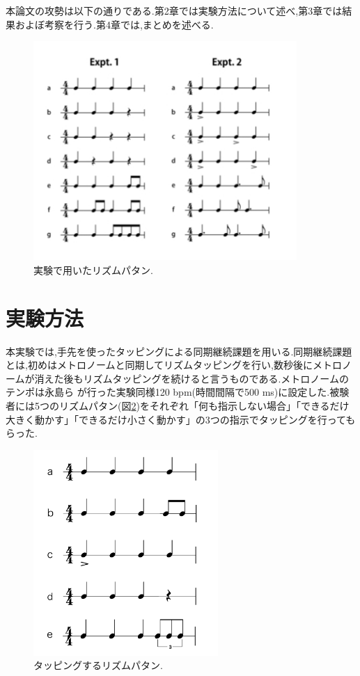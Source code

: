 \documentclass[12pt]{jarticle}
\begin{document}
本論文の攻勢は以下の通りである.第2章では実験方法について述べ,第3章では結果およぼ考察を行う.第4章では,まとめを述べる.
\begin{figure}
  \centering
  \includegraphics[width=10cm]{Nagasima.jpg}
  \caption{実験で用いたリズムパタン\cite{Nagasima}.}
  \label{Nagasima}
\end{figure}

\section{実験方法}
本実験では,手先を使ったタッピングによる同期継続課題を用いる.同期継続課題とは,初めはメトロノームと同期してリズムタッピングを行い,数秒後にメトロノームが消えた後もリズムタッピングを続けると言うものである.メトロノームのテンポは永島ら \cite{Nagasima}が行った実験同様120 bpm(時間間隔で500 ms)に設定した.被験者には5つのリズムパタン(図\ref{pattern})をそれぞれ「何も指示しない場合」「できるだけ大きく動かす」「できるだけ小さく動かす」の3つの指示でタッピングを行ってもらった.

\begin{figure}
  \centering
  \includegraphics[width=7cm]{pattern.jpg}
  \caption{タッピングするリズムパタン.}
  \label{pattern}
\end{figure}  
\end{document}
